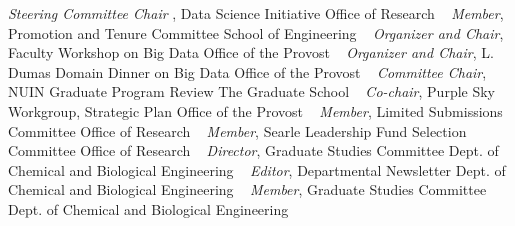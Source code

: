 \GapNoBreak
{}
\textit{Steering Committee Chair },
    Data Science Initiative 
    \newline
Office of Research
\newline
~
\Gap
{}
\textit{Member},
    Promotion and Tenure Committee
    \newline
School of Engineering
\newline
~
\Gap
{}
\textit{Organizer and Chair},
    Faculty Workshop on Big Data
    \newline
Office of the Provost
\newline
~
\Gap
{}
\textit{Organizer and Chair},
    L. Dumas Domain Dinner on Big Data
    \newline
Office of the Provost
\newline
~
\Gap
{}
\textit{Committee Chair},
    NUIN Graduate Program Review 
    \newline
The Graduate School
\newline
~
\Gap
{}
\textit{Co-chair},
    Purple Sky Workgroup, Strategic Plan
    \newline
Office of the Provost
\newline
~
\Gap
{}
\textit{Member},
    Limited Submissions Committee
    \newline
Office of Research
\newline
~
\Gap
{}
\textit{Member},
    Searle Leadership Fund Selection Committee
    \newline
Office of Research
\newline
~
\Gap
{}
\textit{Director},
    Graduate Studies Committee
    \newline
Dept. of Chemical and Biological Engineering
\newline
~
\Gap
{}
\textit{Editor},
    Departmental Newsletter 
    \newline
Dept. of Chemical and Biological Engineering
\newline
~
\Gap
{}
\textit{Member},
    Graduate Studies Committee
    \newline
Dept. of Chemical and Biological Engineering
\newline
